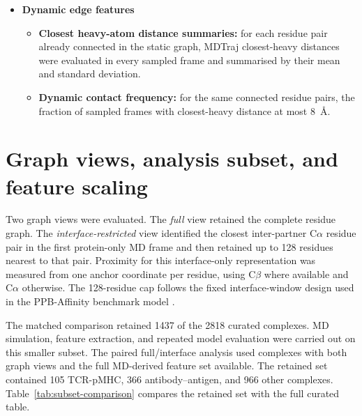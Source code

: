 \begin{itemize}
\begin{itemize}
  \item \textbf{Backbone torsion summaries:} frame-averaged values of $\sin\phi$, $\cos\phi$, $\sin\psi$, and $\cos\psi$, where $\phi$ and $\psi$ are the standard peptide-backbone dihedral angles about the N--C$\alpha$ and C$\alpha$--C bonds.
  \item \textbf{Inter-chain force summaries:} coarse residue-level interaction proxies from a protein-only OpenMM analysis system rebuilt from the prepared protein topology. The original nonbonded parameters were copied into separate Coulomb and Lennard--Jones \texttt{CustomNonbondedForce} objects \citep{Eastman2024OpenMM8}, restricted to ligand-atom versus receptor-atom interaction groups, accumulated from atom-level forces to residue-level Euclidean norms, and stored as framewise means and standard deviations for the electrostatic and van der Waals channels.
  \end{itemize}
\item \textbf{Dynamic edge features}
  \begin{itemize}
  \item \textbf{Closest heavy-atom distance summaries:} for each residue pair already connected in the static graph, MDTraj closest-heavy distances were evaluated in every sampled frame and summarised by their mean and standard deviation.
  \item \textbf{Dynamic contact frequency:} for the same connected residue pairs, the fraction of sampled frames with closest-heavy distance at most 8~\AA.
  \end{itemize}
\end{itemize}

\section{Graph views, analysis subset, and feature scaling}

Two graph views were evaluated. The \emph{full} view retained the complete residue graph. The \emph{interface-restricted} view identified the closest inter-partner C$\alpha$ residue pair in the first protein-only MD frame and then retained up to 128 residues nearest to that pair. Proximity for this interface-only representation was measured from one anchor coordinate per residue, using C$\beta$ where available and C$\alpha$ otherwise. The 128-residue cap follows the fixed interface-window design used in the PPB-Affinity benchmark model \citep{Liu2024PPBAffinity}.

The matched comparison retained 1437 of the 2818 curated complexes. MD simulation, feature extraction, and repeated model evaluation were carried out on this smaller subset. The paired full/interface analysis used complexes with both graph views and the full MD-derived feature set available. The retained set contained 105 TCR-pMHC, 366 antibody--antigen, and 966 other complexes. Table~\ref{tab:subset-comparison} compares the retained set with the full curated table.

